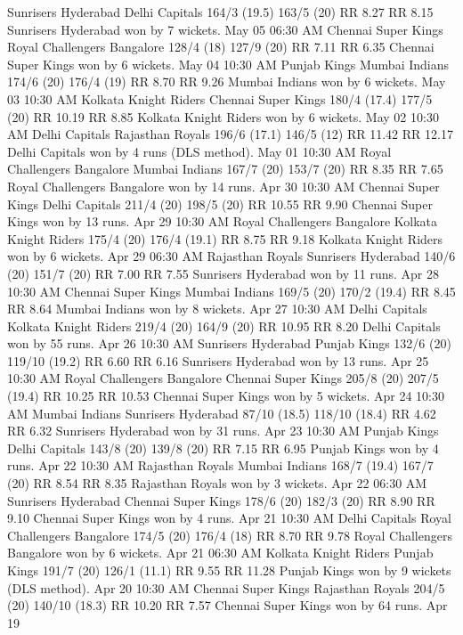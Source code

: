 Sunrisers Hyderabad
Delhi Capitals
164/3 (19.5)
163/5 (20)
RR 8.27
RR 8.15
Sunrisers Hyderabad won by 7 wickets.
May 05
06:30 AM
Chennai Super Kings
Royal Challengers Bangalore
128/4 (18)
127/9 (20)
RR 7.11
RR 6.35
Chennai Super Kings won by 6 wickets.
May 04
10:30 AM
Punjab Kings
Mumbai Indians
174/6 (20)
176/4 (19)
RR 8.70
RR 9.26
Mumbai Indians won by 6 wickets.
May 03
10:30 AM
Kolkata Knight Riders
Chennai Super Kings
180/4 (17.4)
177/5 (20)
RR 10.19
RR 8.85
Kolkata Knight Riders won by 6 wickets.
May 02
10:30 AM
Delhi Capitals
Rajasthan Royals
196/6 (17.1)
146/5 (12)
RR 11.42
RR 12.17
Delhi Capitals won by 4 runs (DLS method).
May 01
10:30 AM
Royal Challengers Bangalore
Mumbai Indians
167/7 (20)
153/7 (20)
RR 8.35
RR 7.65
Royal Challengers Bangalore won by 14 runs.
Apr 30
10:30 AM
Chennai Super Kings
Delhi Capitals
211/4 (20)
198/5 (20)
RR 10.55
RR 9.90
Chennai Super Kings won by 13 runs.
Apr 29
10:30 AM
Royal Challengers Bangalore
Kolkata Knight Riders
175/4 (20)
176/4 (19.1)
RR 8.75
RR 9.18
Kolkata Knight Riders won by 6 wickets.
Apr 29
06:30 AM
Rajasthan Royals
Sunrisers Hyderabad
140/6 (20)
151/7 (20)
RR 7.00
RR 7.55
Sunrisers Hyderabad won by 11 runs.
Apr 28
10:30 AM
Chennai Super Kings
Mumbai Indians
169/5 (20)
170/2 (19.4)
RR 8.45
RR 8.64
Mumbai Indians won by 8 wickets.
Apr 27
10:30 AM
Delhi Capitals
Kolkata Knight Riders
219/4 (20)
164/9 (20)
RR 10.95
RR 8.20
Delhi Capitals won by 55 runs.
Apr 26
10:30 AM
Sunrisers Hyderabad
Punjab Kings
132/6 (20)
119/10 (19.2)
RR 6.60
RR 6.16
Sunrisers Hyderabad won by 13 runs.
Apr 25
10:30 AM
Royal Challengers Bangalore
Chennai Super Kings
205/8 (20)
207/5 (19.4)
RR 10.25
RR 10.53
Chennai Super Kings won by 5 wickets.
Apr 24
10:30 AM
Mumbai Indians
Sunrisers Hyderabad
87/10 (18.5)
118/10 (18.4)
RR 4.62
RR 6.32
Sunrisers Hyderabad won by 31 runs.
Apr 23
10:30 AM
Punjab Kings
Delhi Capitals
143/8 (20)
139/8 (20)
RR 7.15
RR 6.95
Punjab Kings won by 4 runs.
Apr 22
10:30 AM
Rajasthan Royals
Mumbai Indians
168/7 (19.4)
167/7 (20)
RR 8.54
RR 8.35
Rajasthan Royals won by 3 wickets.
Apr 22
06:30 AM
Sunrisers Hyderabad
Chennai Super Kings
178/6 (20)
182/3 (20)
RR 8.90
RR 9.10
Chennai Super Kings won by 4 runs.
Apr 21
10:30 AM
Delhi Capitals
Royal Challengers Bangalore
174/5 (20)
176/4 (18)
RR 8.70
RR 9.78
Royal Challengers Bangalore won by 6 wickets.
Apr 21
06:30 AM
Kolkata Knight Riders
Punjab Kings
191/7 (20)
126/1 (11.1)
RR 9.55
RR 11.28
Punjab Kings won by 9 wickets (DLS method).
Apr 20
10:30 AM
Chennai Super Kings
Rajasthan Royals
204/5 (20)
140/10 (18.3)
RR 10.20
RR 7.57
Chennai Super Kings won by 64 runs.
Apr 19
